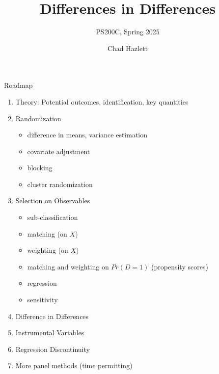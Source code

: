 \documentclass[xcolor=dvipsnames]{beamer}
\title[]{Differences in Differences}
\subtitle[ ]{PS200C, Spring 2025}
\author[Hazlett]{Chad Hazlett }
\institute[UCLA]{UCLA\\[1ex]
  \texttt{chazlett@ucla.edu}
}
\date{}
\begin{document}
\subject{Talks}


\begin{frame}
  \titlepage
\end{frame}

\begin{frame}{Roadmap}
\begin{enumerate}
\item Theory: Potential outcomes, identification, key quantities
\item Randomization
\begin{itemize}
\item difference in means, variance estimation
\item covariate adjustment
\item blocking
\item cluster randomization
\end{itemize}
\item Selection on Observables
\begin{itemize}
\item sub-classification
\item matching (on $X$)
\item weighting (on $X$)
\item matching and weighting on $Pr(D=1)$ (propensity scores)
\item regression 
\item sensitivity
\end{itemize}
\item Difference in Differences
\item Instrumental Variables
\item Regression Discontinuity
\item More panel methods (time permitting)
\end{enumerate}
\end{frame}
\end{document}
